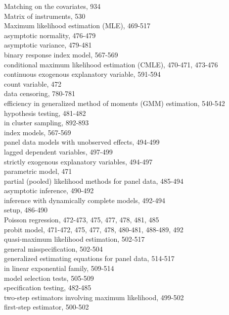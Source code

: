 \documentclass[10pt]{article}
\begin{document}
Matching on the covariates, 934\\
Matrix of instruments, 530\\
Maximum likelihood estimation (MLE), 469-517\\
asymptotic normality, 476-479\\
asymptotic variance, 479-481\\
binary response index model, 567-569\\
conditional maximum likelihood estimation (CMLE), 470-471, 473-476\\
continuous exogenous explanatory variable, 591-594\\
count variable, 472\\
data censoring, 780-781\\
efficiency in generalized method of moments (GMM) estimation, 540-542\\
hypothesis testing, 481-482\\
in cluster sampling, 892-893\\
index models, 567-569\\
panel data models with unobserved effects, 494-499\\
lagged dependent variables, 497-499\\
strictly exogenous explanatory variables, 494-497\\
parametric model, 471\\
partial (pooled) likelihood methods for panel data, 485-494\\
asymptotic inference, 490-492\\
inference with dynamically complete models, 492-494\\
setup, 486-490\\
Poisson regression, 472-473, 475, 477, 478, 481, 485\\
probit model, 471-472, 475, 477, 478, 480-481, 488-489, 492\\
quasi-maximum likelihood estimation, 502-517\\
general misspecification, 502-504\\
generalized estimating equations for panel data, 514-517\\
in linear exponential family, 509-514\\
model selection tests, 505-509\\
specification testing, 482-485\\
two-step estimators involving maximum likelihood, 499-502\\
first-step estimator, 500-502\\
\end{document}
